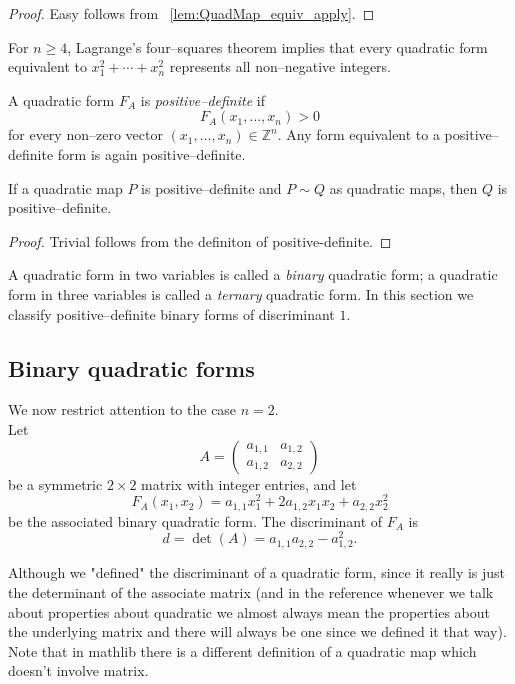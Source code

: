 \begin{proof}
\leanok 
Easy follows from ~\ref{lem:QuadMap_equiv_apply}.
\end{proof}


For $n\ge4$, Lagrange's four–squares theorem implies that every quadratic
form equivalent to $x_1^2+\cdots+x_n^2$ represents all non–negative
integers.

\begin{definition}
\label{def:QuadMap_posdef}
\mathlibok
A quadratic form $F_A$ is \emph{positive–definite} if
\[
  F_A(x_1,\dots,x_n) > 0
\]
for every non–zero vector $(x_1,\dots,x_n)\in\mathbb{Z}^n$.
Any form equivalent to a positive–definite form is again
positive–definite.
\end{definition}

\begin{lemma}
\label{lem:QuadMap_posdef_equiv}
\leanok
If a quadratic map $P$ is positive–definite and $P\sim Q$ as quadratic maps, then
$Q$ is positive–definite.
\end{lemma}
\begin{proof}
\leanok
Trivial follows from the definiton of positive-definite.
\end{proof}

A quadratic form in two variables is called a \emph{binary} quadratic
form; a quadratic form in three variables is called a \emph{ternary}
quadratic form.
In this section we classify positive–definite binary forms of
discriminant $1$.

\subsection*{Binary quadratic forms}

We now restrict attention to the case $n=2$. \\

Let
\[
  A =
  \begin{pmatrix}
    a_{1,1} & a_{1,2}\\[0.3em]
    a_{1,2} & a_{2,2}
  \end{pmatrix}
\]
be a symmetric $2\times2$ matrix with integer entries, and let
\[
  F_A(x_1,x_2)
  = a_{1,1}x_1^2 + 2a_{1,2}x_1x_2 + a_{2,2}x_2^2
\]
be the associated binary quadratic form.
The discriminant of $F_A$ is
\[
  d = \det(A) = a_{1,1}a_{2,2} - a_{1,2}^2.
\]

\begin{remark}
Although we "defined" the discriminant of a quadratic form, since it really is just the determinant of the 
associate matrix (and in the reference whenever we talk about properties about quadratic we almost always mean the 
properties about the underlying matrix and there will always be one since we defined it that way). Note that 
in mathlib there is a different definition of a quadratic map which doesn't involve matrix.
\end{remark}

